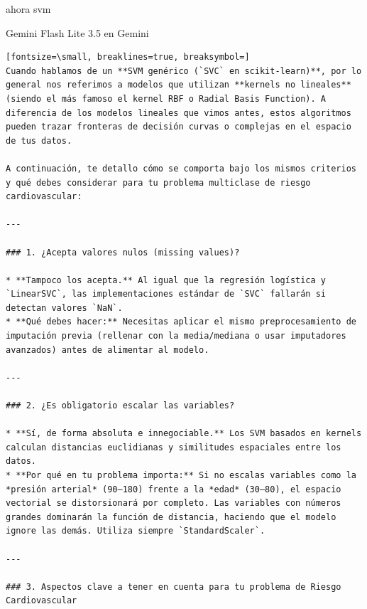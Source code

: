 \documentclass[12pt,a4paper,oneside]{book}
\begin{document}
\begin{iaprompt}
ahora svm
\end{iaprompt}
\begin{iaresp}{Gemini Flash Lite 3.5 en Gemini}
\begin{Verbatim}[fontsize=\small, breaklines=true, breaksymbol=]
Cuando hablamos de un **SVM genérico (`SVC` en scikit-learn)**, por lo general nos referimos a modelos que utilizan **kernels no lineales** (siendo el más famoso el kernel RBF o Radial Basis Function). A diferencia de los modelos lineales que vimos antes, estos algoritmos pueden trazar fronteras de decisión curvas o complejas en el espacio de tus datos.

A continuación, te detallo cómo se comporta bajo los mismos criterios y qué debes considerar para tu problema multiclase de riesgo cardiovascular:

---

### 1. ¿Acepta valores nulos (missing values)?

* **Tampoco los acepta.** Al igual que la regresión logística y `LinearSVC`, las implementaciones estándar de `SVC` fallarán si detectan valores `NaN`.
* **Qué debes hacer:** Necesitas aplicar el mismo preprocesamiento de imputación previa (rellenar con la media/mediana o usar imputadores avanzados) antes de alimentar al modelo.

---

### 2. ¿Es obligatorio escalar las variables?

* **Sí, de forma absoluta e innegociable.** Los SVM basados en kernels calculan distancias euclidianas y similitudes espaciales entre los datos.
* **Por qué en tu problema importa:** Si no escalas variables como la *presión arterial* (90–180) frente a la *edad* (30–80), el espacio vectorial se distorsionará por completo. Las variables con números grandes dominarán la función de distancia, haciendo que el modelo ignore las demás. Utiliza siempre `StandardScaler`.

---

### 3. Aspectos clave a tener en cuenta para tu problema de Riesgo Cardiovascular


\end{Verbatim}
\end{iaresp}
\end{document}
